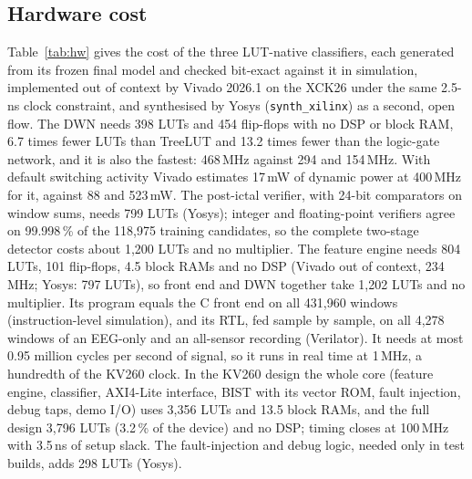 \documentclass[conference]{IEEEtran}
\begin{document}
\subsection{Hardware cost}
Table~\ref{tab:hw} gives the cost of the three LUT-native classifiers, each generated from its frozen final model and
checked bit-exact against it in simulation, implemented out of context by Vivado 2026.1 on the XCK26 under the same
2.5-ns clock constraint, and synthesised by Yosys (\texttt{synth\_xilinx}) as a second, open flow. The DWN needs 398
LUTs and 454 flip-flops with no DSP or block RAM, 6.7 times fewer LUTs than TreeLUT and 13.2 times fewer than the
logic-gate network, and it is also the fastest: 468\,MHz against 294 and 154\,MHz. With default switching activity
Vivado estimates 17\,mW of dynamic power at 400\,MHz for it, against 88 and 523\,mW. The post-ictal verifier, with
24-bit comparators on window sums, needs 799 LUTs (Yosys); integer and floating-point verifiers agree on 99.998\,\% of
the 118,975 training candidates, so the complete two-stage detector costs about 1,200 LUTs and no multiplier. The
feature engine needs 804 LUTs, 101 flip-flops, 4.5 block RAMs and no DSP (Vivado out of context, 234\,MHz; Yosys:
797 LUTs), so front end and DWN together take 1,202 LUTs and no multiplier. Its program equals the C front end on all
431,960 windows (instruction-level simulation), and its RTL, fed sample by sample, on all 4,278 windows of an
EEG-only and an all-sensor recording (Verilator). It needs at most 0.95 million cycles per second of signal, so it
runs in real time at 1\,MHz, a hundredth of the KV260 clock. In the KV260 design the whole core (feature engine,
classifier, AXI4-Lite interface, BIST with its vector ROM, fault injection, debug taps, demo I/O) uses 3,356 LUTs and
13.5 block RAMs, and the full design 3,796 LUTs (3.2\,\% of the device) and no DSP; timing closes at 100\,MHz with
3.5\,ns of setup slack. The fault-injection and debug logic, needed only in test builds, adds 298 LUTs (Yosys).
\end{document}
